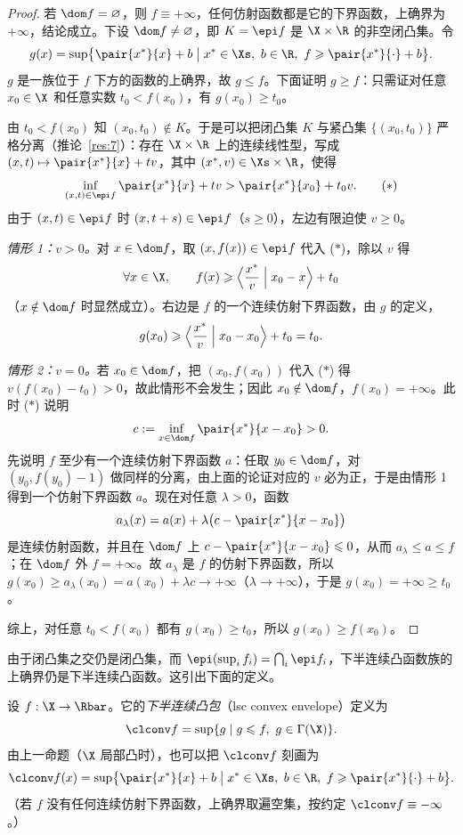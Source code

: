 \begin{proof}
若 $\dom f=\varnothing$，则 $f\equiv+\infty$，任何仿射函数都是它的下界函数，上确界为 $+\infty$，结论成立。下设 $\dom f\neq\varnothing$，即 $K=\epi f$ 是 $\X\times\R$ 的非空闭凸集。令
\[
  g(x)=\sup\bigl\{\pair{x^*}{x}+b \bigm| x^*\in\Xs,\ b\in\R,\ f\geqslant\pair{x^*}{\cdot}+b\bigr\}.
\]
$g$ 是一族位于 $f$ 下方的函数的上确界，故 $g\leqslant f$。下面证明 $g\geqslant f$：只需证对任意 $x_0\in\X$ 和任意实数 $t_0<f(x_0)$，有 $g(x_0)\geqslant t_0$。

由 $t_0<f(x_0)$ 知 $(x_0,t_0)\notin K$。于是可以把闭凸集 $K$ 与紧凸集 $\{(x_0,t_0)\}$ 严格分离（推论~\ref{res:7}）：存在 $\X\times\R$ 上的连续线性型，写成 $(x,t)\mapsto\pair{x^*}{x}+tv$，其中 $(x^*,v)\in\Xs\times\R$，使得
\[
  \inf_{(x,t)\in\epi f}\pair{x^*}{x}+tv>\pair{x^*}{x_0}+t_0v. \tag{$\ast$}
\]
由于 $(x,t)\in\epi f$ 时 $(x,t+s)\in\epi f$（$s\geqslant0$），左边有限迫使 $v\geqslant0$。

\emph{情形 1：$v>0$。}对 $x\in\dom f$，取 $(x,f(x))\in\epi f$ 代入 ($\ast$)，除以 $v$ 得
\[
  \forall x\in\X,\qquad f(x)\geqslant\Bigl\langle\frac{x^*}{v}\Bigm| x_0-x\Bigr\rangle+t_0
\]
（$x\notin\dom f$ 时显然成立）。右边是 $f$ 的一个连续仿射下界函数，由 $g$ 的定义，
\[
  g(x_0)\geqslant\Bigl\langle\frac{x^*}{v}\Bigm| x_0-x_0\Bigr\rangle+t_0=t_0 .
\]

\emph{情形 2：$v=0$。}若 $x_0\in\dom f$，把 $(x_0,f(x_0))$ 代入 ($\ast$) 得 $v(f(x_0)-t_0)>0$，故此情形不会发生；因此 $x_0\notin\dom f$，$f(x_0)=+\infty$。此时 ($\ast$) 说明
\[
  c:=\inf_{x\in\dom f}\pair{x^*}{x-x_0}>0 .
\]
先说明 $f$ 至少有一个连续仿射下界函数 $a$：任取 $y_0\in\dom f$，对 $(y_0,f(y_0)-1)$ 做同样的分离，由上面的论证对应的 $v$ 必为正，于是由情形 1 得到一个仿射下界函数 $a$。现在对任意 $\lambda>0$，函数
\[
  a_\lambda(x)=a(x)+\lambda\bigl(c-\pair{x^*}{x-x_0}\bigr)
\]
是连续仿射函数，并且在 $\dom f$ 上 $c-\pair{x^*}{x-x_0}\leqslant0$，从而 $a_\lambda\leqslant a\leqslant f$；在 $\dom f$ 外 $f=+\infty$。故 $a_\lambda$ 是 $f$ 的仿射下界函数，所以 $g(x_0)\geqslant a_\lambda(x_0)=a(x_0)+\lambda c\to+\infty$（$\lambda\to+\infty$），于是 $g(x_0)=+\infty\geqslant t_0$。

综上，对任意 $t_0<f(x_0)$ 都有 $g(x_0)\geqslant t_0$，所以 $g(x_0)\geqslant f(x_0)$。
\end{proof}

由于闭凸集之交仍是闭凸集，而 $\epi(\sup_if_i)=\bigcap_i\epi f_i$，下半连续凸函数族的上确界仍是下半连续凸函数。这引出下面的定义。

\begin{definition}[下半连续凸包]
\label{def:17}
设 $f:\X\to\Rbar$。它的\emph{下半连续凸包}（lsc convex envelope）定义为
\[
  \clconv f=\sup\{g \mid g\leqslant f,\ g\in\Gamma(\X)\}.
\]
由上一命题（$\X$ 局部凸时），也可以把 $\clconv f$ 刻画为
\[
  \clconv f(x)=\sup\bigl\{\pair{x^*}{x}+b \bigm| x^*\in\Xs,\ b\in\R,\ f\geqslant\pair{x^*}{\cdot}+b\bigr\}.
\]
（若 $f$ 没有任何连续仿射下界函数，上确界取遍空集，按约定 $\clconv f\equiv-\infty$。）
\end{definition}

